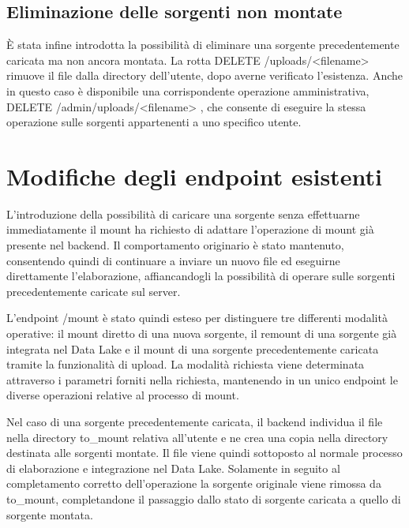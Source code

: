 \documentclass[13.6pt,a4paper]{report}
\begin{document}
\subsection*{Eliminazione delle sorgenti non montate}

È stata infine introdotta la possibilità di eliminare una sorgente precedentemente caricata ma non ancora montata. La rotta \colorbox{gray!15}{DELETE /uploads/<filename> } rimuove il file dalla directory dell'utente, dopo averne verificato l'esistenza. Anche in questo caso è disponibile una corrispondente operazione amministrativa, \colorbox{gray!15}{DELETE /admin/uploads/<filename> }, che consente di eseguire la stessa operazione sulle sorgenti appartenenti a uno specifico utente.

\section{Modifiche degli endpoint esistenti}


L'introduzione della possibilità di caricare una sorgente senza effettuarne immediatamente il mount ha richiesto di adattare l'operazione di mount già presente nel backend. Il comportamento originario è stato mantenuto, consentendo quindi di continuare a inviare un nuovo file ed eseguirne direttamente l'elaborazione, affiancandogli la possibilità di operare sulle sorgenti precedentemente caricate sul server.

\noindent
L'endpoint /mount è stato quindi esteso per distinguere tre differenti modalità operative: il mount diretto di una nuova sorgente, il remount di una sorgente già integrata nel Data Lake e il mount di una sorgente precedentemente caricata tramite la funzionalità di upload. La modalità richiesta viene determinata attraverso i parametri forniti nella richiesta, mantenendo in un unico endpoint le diverse operazioni relative al processo di mount.

\noindent
Nel caso di una sorgente precedentemente caricata, il backend individua il file nella directory to\_mount relativa all'utente e ne crea una copia nella directory destinata alle sorgenti montate. Il file viene quindi sottoposto al normale processo di elaborazione e integrazione nel Data Lake. Solamente in seguito al completamento corretto dell'operazione la sorgente originale viene rimossa da to\_mount, completandone il passaggio dallo stato di sorgente caricata a quello di sorgente montata.
\end{document}
